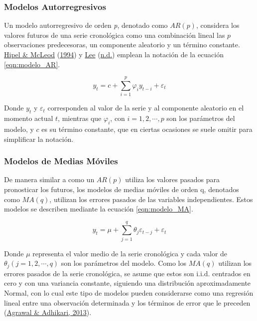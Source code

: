 \documentclass[
]{article}
\begin{document}
\subsubsection{Modelos Autorregresivos}

Un modelo autorregresivo de orden \emph{p}, denotado como \(AR(p)\),
considera los valores futuros de una serie cronológica como una
combinación lineal las \(p\) observaciones predecesoras, un componente
aleatorio y un término constante. \protect\hyperlink{ref-Hipel}{Hipel \&
McLeod} (\protect\hyperlink{ref-Hipel}{1994}) y
\protect\hyperlink{ref-Lee}{Lee} (\protect\hyperlink{ref-Lee}{n.d.})
emplean la notación de la ecuación \ref{eqn:modelo_AR}.

\begin{equation}
\label{eqn:modelo_AR}
y_t=c+\sum_{i=1}^p \varphi_iy_{t-i}+\varepsilon_t
\end{equation}

Donde \(y_t\) y \(\varepsilon_t\) corresponden al valor de la serie y al
componente aleatorio en el momento actual \(t\), mientras que
\(\varphi_i\), con \(i=1,2,\cdots,p\) son los parámetros del modelo, y
\(c\) es su término constante, que en ciertas ocasiones se suele omitir
para simplificar la notación.

\subsubsection{Modelos de Medias Móviles}

De manera similar a como un \(AR(p)\) utiliza los valores pasados para
pronosticar los futuros, los modelos de medias móviles de orden q,
denotados como \(MA(q)\), utilizan los errores pasados de las variables
independientes. Estos modelos se describen mediante la ecuación
\ref{eqn:modelo_MA}.

\begin{equation}
\label{eqn:modelo_MA}
y_t=\mu+\sum_{j=1}^q \theta_j \varepsilon_{t-j}+\varepsilon_t
\end{equation}

Donde \(\mu\) representa el valor medio de la serie cronológica y cada
valor de \(\theta_j(j=1,2,\cdots,q)\) son los parámetros del modelo.
Como los \(MA(q)\) utilizan los errores pasados de la serie cronológica,
se asume que estos son i.i.d. centrados en cero y con una variancia
constante, siguiendo una distribución aproximadamente Normal, con lo
cual este tipo de modelos pueden considerarse como una regresión lineal
entre una observación determinada y los términos de error que le
preceden (\protect\hyperlink{ref-stationary_def}{Agrawal \& Adhikari,
2013}).
\end{document}
